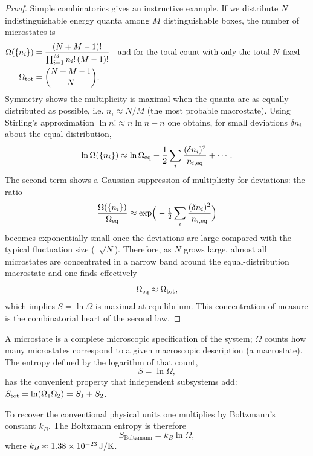 \documentclass[11pt]{report}
\begin{document}
\begin{proof}
    Simple combinatorics gives an instructive example. If we distribute \(N\) indistinguishable energy quanta among \(M\) distinguishable boxes, the number of microstates is
    \begin{align*}
        \Omega(\{n_i\}) &= \frac{(N+M-1)!}{\prod_{i=1}^M n_i!\,(M-1)!}
        \quad\text{and for the total count with only the total \(N\) fixed}\quad \\
        \Omega_{\rm tot} & =\binom{N+M-1}{N}.
    \end{align*}
    Symmetry shows the multiplicity is maximal when the quanta are as equally distributed as possible, i.e. \(n_i \approx N/M\) (the most probable macrostate). Using Stirling's approximation \(\ln n!\approx n\ln n - n\) one obtains, for small deviations \(\delta n_i\) about the equal distribution,
    $$
        \ln\Omega(\{n_i\}) \approx \ln\Omega_{\rm eq} - \frac{1}{2}\sum_{i}\frac{(\delta n_i)^2}{n_{i,\rm eq}} + \cdots.
    $$
    The second term shows a Gaussian suppression of multiplicity for deviations: the ratio
    $$
        \frac{\Omega(\{n_i\})}{\Omega_{\rm eq}} \approx \exp\!\Big(-\tfrac{1}{2}\sum_i\frac{(\delta n_i)^2}{n_{i,\rm eq}}\Big)
    $$
    becomes exponentially small once the deviations are large compared with the typical fluctuation size (~\(\sqrt{N}\)). Therefore, as \(N\) grows large, almost all microstates are concentrated in a narrow band around the equal-distribution macrostate and one finds effectively
    $$
        \Omega_{\rm eq} \approx \Omega_{\rm tot},
    $$
    which implies \(S=\ln\Omega\) is maximal at equilibrium. This concentration of measure is the combinatorial heart of the second law.
\end{proof}

\begin{definition}
    A microstate is a complete microscopic specification of the system; \(\Omega\) counts how many microstates correspond to a given macroscopic description (a macrostate). The entropy defined by the logarithm of that count,
    \begin{equation}
        S = \ln \Omega,
    \end{equation}
    has the convenient property that independent subsystems add: \(S_{\rm tot}=\ln(\Omega_1\Omega_2)=S_1+S_2\).

    To recover the conventional physical units one multiplies by Boltzmann's constant \(k_B\). The Boltzmann entropy is therefore
    \begin{equation}
        S_{\text{Boltzmann}} = k_B \ln \Omega,
    \end{equation}
    where \(k_B \approx 1.38\times 10^{-23}\,{\rm J/K}\).
\end{definition}
\end{document}
